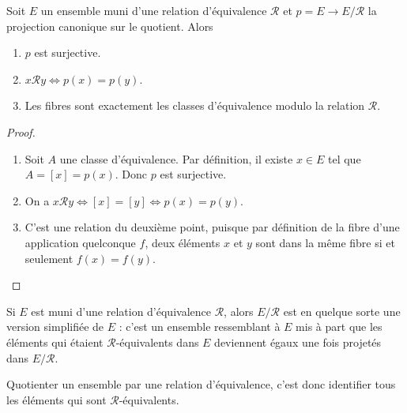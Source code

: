\begin{proposition}
Soit $E$ un ensemble muni d'une relation d'équivalence ${\mathcal R}$ et $p = E\to E/\mathcal R$ la projection canonique sur le quotient. Alors 
\begin{enumerate}
\item $p$ est surjective.
\item $x\mathcal R y \iff p(x)=p(y)$.
\item Les fibres sont exactement les classes d'équivalence modulo la relation $\mathcal R$.
\end{enumerate}
\end{proposition}
\begin{proof}
\begin{enumerate}
\item Soit $A$ une classe d'équivalence. Par définition, il existe $x\in E$ tel que $A = [x] = p(x)$. Donc $p$ est surjective.
\item On a $x\mathcal R y \iff [x] = [y] \iff p(x)=p(y)$.
\item C'est une relation du deuxième point, puisque par définition de la fibre d'une application quelconque $f$, deux éléments $x$ et $y$ sont dans la même fibre si et seulement $f(x)=f(y)$.
\end{enumerate}
\end{proof}


\begin{mdframed}[linewidth=2]
Si $E$ est muni d'une relation d'équivalence $\mathcal R$, alors $E/\mathcal R$ est en quelque sorte une version  \og simplifiée\fg{} de $E$ : c'est un ensemble ressemblant à $E$ mis à part que les éléments qui étaient $\mathcal R$-équivalents dans $E$ deviennent égaux une fois projetés dans $E/\mathcal R$.

Quotienter un ensemble par une relation d'équivalence, c'est donc identifier tous les éléments qui sont $\mathcal R$-équivalents.
\end{mdframed}





